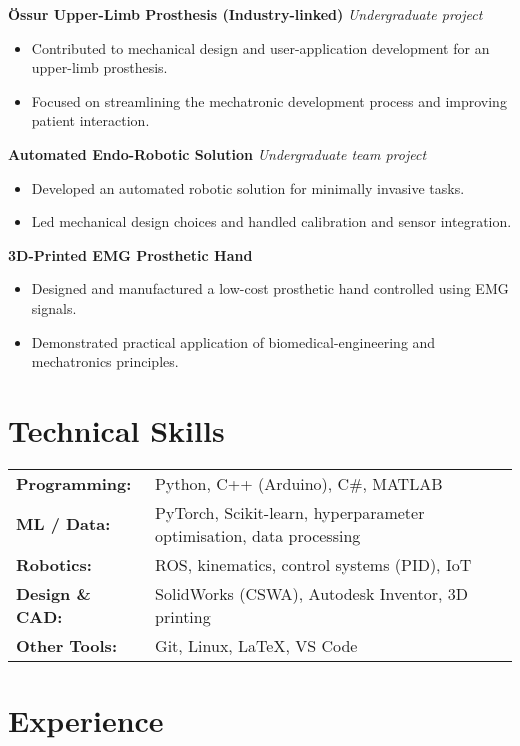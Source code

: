 \documentclass[a4paper,11pt]{article}
\begin{document}
\textbf{Össur Upper-Limb Prosthesis (Industry-linked)} \hfill \textit{Undergraduate project}
\begin{itemize}
    \item Contributed to mechanical design and user-application development for an upper-limb prosthesis.
    \item Focused on streamlining the mechatronic development process and improving patient interaction.
\end{itemize}

\textbf{Automated Endo-Robotic Solution} \hfill \textit{Undergraduate team project}
\begin{itemize}
    \item Developed an automated robotic solution for minimally invasive tasks.
    \item Led mechanical design choices and handled calibration and sensor integration.
\end{itemize}

\textbf{3D-Printed EMG Prosthetic Hand}
\begin{itemize}
    \item Designed and manufactured a low-cost prosthetic hand controlled using EMG signals.
    \item Demonstrated practical application of biomedical-engineering and mechatronics principles.
\end{itemize}


\section*{Technical Skills}

\begin{tabular}{@{}ll}
\textbf{Programming:} & Python, C++ (Arduino), C\#, MATLAB \\
\textbf{ML / Data:} & PyTorch, Scikit-learn, hyperparameter optimisation, data processing \\
\textbf{Robotics:} & ROS, kinematics, control systems (PID), IoT \\
\textbf{Design \& CAD:} & SolidWorks (CSWA), Autodesk Inventor, 3D printing \\
\textbf{Other Tools:} & Git, Linux, LaTeX, VS Code
\end{tabular}


\section*{Experience}
\end{document}
